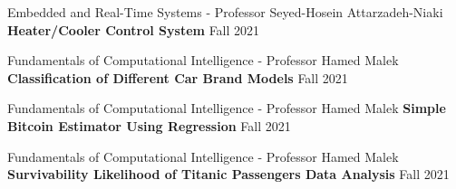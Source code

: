   \begin{cventries}
    
    
    \cventry
    {Embedded and Real-Time Systems - Professor Seyed-Hosein Attarzadeh-Niaki}
    {\textbf {Heater/Cooler Control System}}
    {}
    {Fall 2021}
    {}
    \vspace{0.0 cm}
  \end{cventries}
  \begin{cventries}
    
      \cventry
    {Fundamentals of Computational Intelligence - Professor Hamed Malek}
    {\textbf {Classification of Different Car Brand Models}}
    {}
    {Fall 2021}
    {}
    \vspace{0.0 cm}
  \end{cventries}
  \begin{cventries}
	
	    \cventry
    {Fundamentals of Computational Intelligence - Professor Hamed Malek}
    {\textbf {Simple Bitcoin Estimator Using Regression}}
    {}
    {Fall 2021}
    {}
    \vspace{0.0 cm}
  \end{cventries}
  \begin{cventries}

      \cventry
    {Fundamentals of Computational Intelligence - Professor Hamed Malek}
    {\textbf {Survivability Likelihood of Titanic Passengers Data Analysis}}
    {}
    {Fall 2021}
    {}
    \vspace{0.0 cm}
  \end{cventries}
